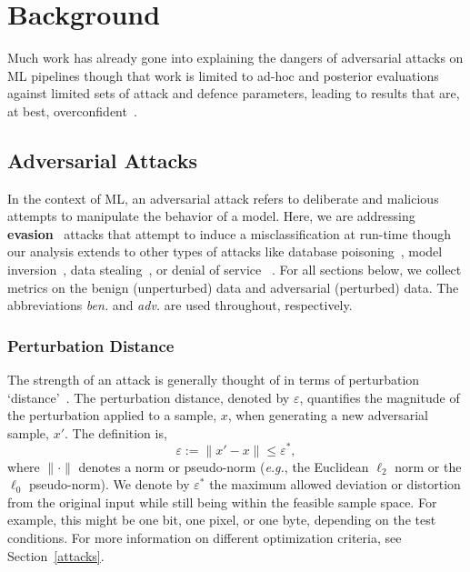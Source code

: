 \section{Background}


Much work has already gone into explaining the dangers of adversarial attacks on ML pipelines \cite{carlini_towards_2017,croce_reliable_2020,pixelattack,fgm,biggio_evasion_2013} though that work is limited to ad-hoc and posterior evaluations against limited sets of attack and defence parameters, leading to results that are, at best, overconfident~\cite{meyers,ma2020imbalanced}. 

\subsection{Adversarial Attacks}

In the context of ML, an adversarial attack refers to deliberate and malicious attempts to manipulate the behavior of a model. Here, we are addressing \textbf{evasion}~\cite{carlini_towards_2017} attacks that attempt to induce a misclassification at run-time though our analysis extends to other types of attacks like database poisoning~\cite{biggio_poisoning_2013,saha2020hidden}, model inversion~\cite{choquette2021label,li2021membership}, data stealing~\cite{orekondy2019knockoff}, or denial of service ~\cite{santos2021universal}. For all sections below, we collect metrics on the benign (unperturbed) data and adversarial (perturbed) data. The abbreviations \textit{ben.} and \textit{adv.} are used throughout, respectively.


\subsubsection{Perturbation Distance}

\label{perturbation_distance}
The strength of an attack is generally thought of in terms of perturbation `distance'~\cite{croce_reliable_2020,chakraborty_adversarial_2018,pixelattack}. The perturbation distance, denoted by $\varepsilon$, quantifies the magnitude of the perturbation applied to a sample, $x$, when generating a new adversarial sample, $x'$. The definition is,
\[
    \varepsilon := \| x' - x \| \leq \varepsilon^*,
\]
where $\| \cdot \|$ denotes a norm or pseudo-norm (\textit{e.g.}, the Euclidean $\ell_2$ norm or the $\ell_0$ pseudo-norm). We denote by $\varepsilon^*$ the maximum allowed deviation or distortion from the original input while still being within the feasible sample space. For example, this might be one bit, one pixel, or one byte, depending on the test conditions. For more information on different optimization criteria, see Section~\ref{attacks}.


